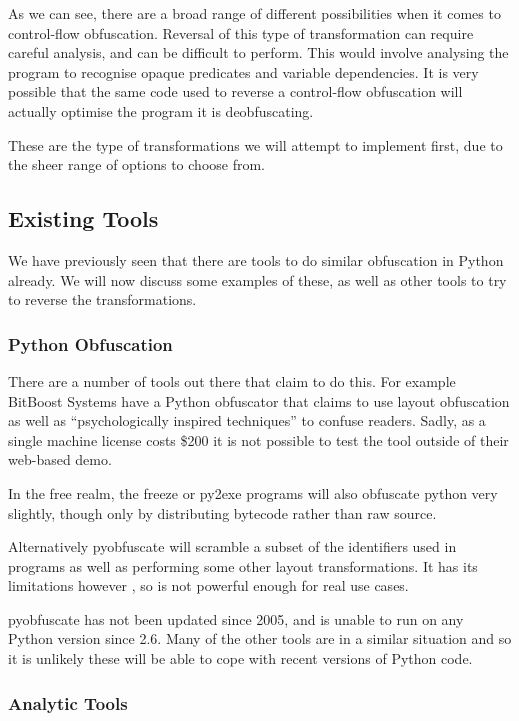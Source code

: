 \documentclass[twoside,a4paper]{report}
\begin{document}
As we can see, there are a broad range of different possibilities when it comes to control-flow obfuscation. Reversal of this type
of transformation can require careful analysis, and can be difficult to perform. This would involve analysing the program to recognise
opaque predicates and variable dependencies. It is very possible that the same code used to reverse a control-flow obfuscation will
actually optimise the program it is deobfuscating.

These are the type of transformations we will attempt to implement first, due to the sheer range of options to choose from.

\subsection{Existing Tools}

We have previously seen that there are tools to do similar obfuscation in Python already. We will now discuss some
examples of these, as well as other tools to try to reverse the transformations.

\subsubsection{Python Obfuscation}

There are a number of tools out there that claim to do this. For example BitBoost Systems have a Python obfuscator \cite{bitboost}
that claims to use layout obfuscation as well as ``psychologically inspired techniques'' to confuse readers. Sadly, as a
single machine license costs \$200 it is not possible to test the tool outside of their web-based demo.

In the free realm, the freeze \cite{freezereadme} or py2exe \cite{py2exe} programs will also obfuscate python very slightly,
though only by distributing bytecode rather than raw source.

Alternatively pyobfuscate \cite{pyobf} will scramble a subset of the identifiers used in programs as well as performing
some other layout transformations. It has its limitations however \cite{pyobf}, so is not powerful enough for real use cases.

pyobfuscate has not been updated since 2005, and is unable to run on any Python version since 2.6. Many of the other tools are in
a similar situation and so it is unlikely these will be able to cope with recent versions of Python code.

\subsubsection{Analytic Tools}
\end{document}
